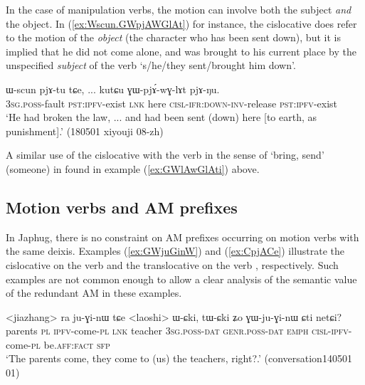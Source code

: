 In the case of manipulation verbs, the motion can involve both the subject \textit{and} the object. In (\ref{ex:Wscun.GWpjAWGlAt}) for instance, the cislocative does refer to the motion of the \textit{object} (the character who has been sent down), but it is implied that he did not come alone, and was brought to his current place by the unspecified \textit{subject} of the verb  `s/he/they sent/brought him down'.

\begin{exe}
	\ex \label{ex:Wscun.GWpjAWGlAt}
	\gll ɯ-scun pjɤ-tu tɕe,  ... kutɕu ɣɯ-pjɤ́-wɣ-lɤt pjɤ-ŋu.  \\
	\textsc{3sg}.\textsc{poss}-fault \textsc{pst}:\textsc{ipfv}-exist \textsc{lnk} { } here  \textsc{cisl}-\textsc{ifr}:\textsc{down}-\textsc{inv}-release \textsc{pst}:\textsc{ipfv}-exist \\ 
	\glt `He had broken the law, ... and had been sent (down) here [to earth, as punishment].' (180501 xiyouji 08-zh) 
\end{exe} 

A similar use of the cislocative with the verb  in the sense of `bring, send' (someone) in found in example (\ref{ex:GWlAwGlAti}) above.

\subsection{Motion verbs and AM prefixes} \label{sec:motion.verbs.AM}
In Japhug, there is no constraint on AM prefixes occurring on motion verbs with the same deixis. Examples (\ref{ex:GWjuGinW}) and (\ref{ex:CpjACe}) illustrate the cislocative on the verb  and the translocative on the verb , respectively. Such examples are not common enough to allow a clear analysis of the semantic value of the redundant AM in these examples.

\begin{exe}
\ex \label{ex:GWjuGinW}
 \gll <jiazhang> ra ju-ɣi-nɯ tɕe <laoshi> ɯ-ɕki, tɯ-ɕki ʑo ɣɯ-ju-ɣi-nɯ ɕti netɕi? \\
 parents \textsc{pl} \textsc{ipfv}-come-\textsc{pl} \textsc{lnk} teacher \textsc{3sg}.\textsc{poss}-\textsc{dat} \textsc{genr}.\textsc{poss}-\textsc{dat} \textsc{emph} \textsc{cisl}-\textsc{ipfv}-come-\textsc{pl} be.\textsc{aff}:\textsc{fact} \textsc{sfp} \\
 \glt `The parents come, they come to (us) the teachers, right?.' (conversation140501 01)
\end{exe}


